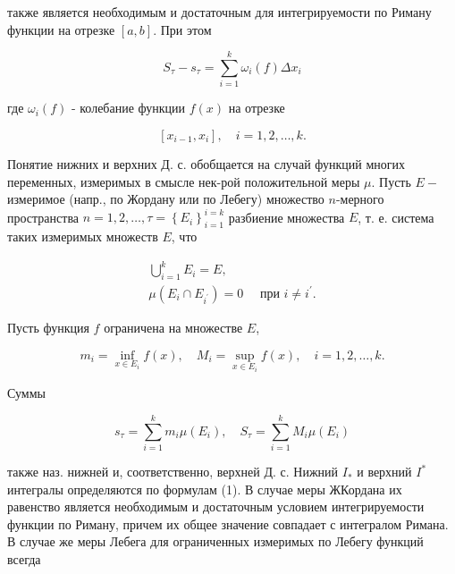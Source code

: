 \documentclass[10pt]{article}
\begin{document}
также является необходимым и достаточным для интегрируемости по Риману функции на отрезке $[a, b]$. При этом



\[

S_{\tau}-s_{\tau}=\sum_{i=1}^{k} \omega_{i}(f) \Delta x_{i}

\]



где $\omega_{i}(f)$ - колебание функции $f(x)$ на отрезке



\[

\left[x_{i-1}, x_{i}\right], \quad i=1,2, \ldots, k .

\]



Понятие нижних и верхних Д. с. обобщается на случай функций многих переменных, измеримых в смысле нек-рой положительной меры $\mu$. Пусть $E-$ измеримое (напр., по Жордану или по Лебегу) множество $n$-мерного пространства $n=1,2, \ldots, \tau=\left\{E_{i}\right\}_{i=1}^{i=k}$ разбиение множества $E$, т. е. система таких измеримых множеств $E$, что



\[

\begin{gathered}

\bigcup_{i=1}^{k} E_{i}=E, \\

\mu\left(E_{i} \cap E_{i^{\prime}}\right)=0 \quad \text { при } i \neq i^{\prime} .

\end{gathered}

\]



Пусть функция $f$ ограничена на множестве $E$,



\[

m_{i}=\inf _{x \in E_{i}} f(x), \quad M_{i}=\sup _{x \in E_{i}} f(x), \quad i=1,2, \ldots, k .

\]



Суммы



\[

s_{\tau}=\sum_{i=1}^{k} m_{i} \mu\left(E_{i}\right), \quad S_{\tau}=\sum_{i=1}^{k} M_{i} \mu\left(E_{i}\right)

\]



также наз. нижней и, соответственно, верхней Д. с. Нижний $I_{*}$ и верхний $I^{*}$ интегралы определяются по формулам (1). В случае меры ЖКордана их равенство является необходимым и достаточным условием интегрируемости функции по Риману, причем их общее значение совпадает с интегралом Римана. В случае же меры Лебега для ограниченных измеримых по Лебегу функций всегда
\end{document}
